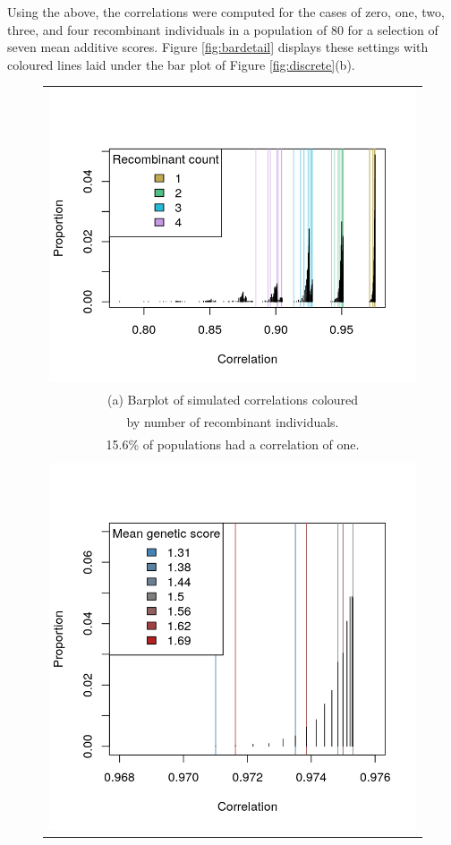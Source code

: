\documentclass[sts]{imsart}
\begin{document}
Using the above, the correlations were computed for the cases of zero, one, two, three, and four recombinant individuals in a population of 80 for a selection of seven mean additive scores. Figure \ref{fig:bardetail} displays these settings with coloured lines laid under the bar plot of Figure \ref{fig:discrete}(b).
\begin{figure}[htp]
  \begin{center}
    \begin{tabular}{c}
      \includegraphics[scale = 0.6]{../img/strngBarLndscp.png} \\ %
      {\footnotesize (a) Barplot of simulated correlations coloured} \\
      {\footnotesize by number of recombinant individuals.} \\
      {\footnotesize 15.6\% of populations had a correlation of one.  } \\
      \\
      \includegraphics[scale = 0.6]{../img/strngBarClose.png} \\

\end{tabular}
\end{center}
\end{figure}
\end{document}
